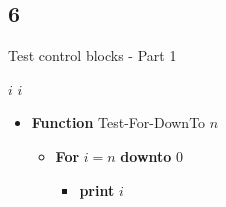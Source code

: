 \documentclass[
  letterpaper,
  DIV=11,
  numbers=noendperiod]{scrartcl}
\providecommand{\tightlist}{%
  \setlength{\itemsep}{0pt}\setlength{\parskip}{0pt}}\usepackage{longtable,booktabs,array}
\begin{document}
\subsection{6}\label{section-3}

\begin{algorithm}
\caption{Test control blocks - Part 1}
\begin{algorithmic}[1]
    \Print $i$
  \EndFor
\EndFunction
{}
    \Print $i$
  \EndFor
\EndFunction
\end{algorithmic}
\end{algorithm}

\begin{itemize}
\tightlist
\item
  \textbf{Function} Test-For-DownTo \(n\)

  \begin{itemize}
  \tightlist
  \item
    \textbf{For} \(i=n\) \textbf{downto} \(0\)

    \begin{itemize}
    \tightlist
    \item
      \textbf{print} \(i\)
    \end{itemize}
  \end{itemize}
\end{itemize}
\end{document}
